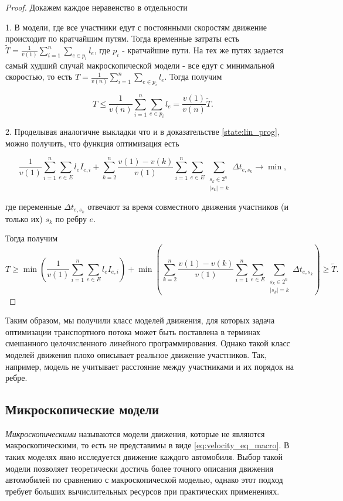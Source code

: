 \documentclass[12pt, a4paper]{article}
\DeclareMathOperator*{\minn}{min}
\begin{document}
\begin{proof}
	Докажем каждое неравенство в отдельности
	
	1. В модели, где все участники едут с постоянными скоростям движение происходит по кратчайшим путям. Тогда временные затраты есть $\widetilde{T} = \frac{1}{v(1)} \sum \limits _{i = 1} ^ n \sum\limits_{e \in p_i} l_e$, где $p_i$ - кратчайшие пути.
	На тех же путях задается самый худший случай макроскопической модели - все едут с минимальной скоростью, то есть $ T = \frac{1}{v(n)} \sum \limits _{i = 1} ^ n \sum\limits_{e \in p_i} l_e$. Тогда получим
	
	$$T \le  \frac{1}{v(n)} \sum \limits _{i = 1} ^ n \sum\limits_{e \in p_i} l_e = \frac {v(1)}{v(n)} \widetilde{T}.$$
	
	2. Проделывая аналогичне выкладки что и в доказательстве \ref{state:lin_prog}, можно получить, что функция оптимизация есть 
	
	$$ \frac{1}{v (1)} \sum\limits_{i = 1}^n \sum \limits _{e \in E} l_e I_{e, i} +  \sum\limits_{k = 2}^{n} \frac{v(1) - v(k)}{v (1)}  \sum\limits_{i = 1}^n \sum \limits _{e \in E} \sum\limits _{\substack{ s_k \in 2^n \\ |s_k| = k}}  \Delta t_{e, s_k} \rightarrow \minn ,$$
	
	где переменные $\Delta t_{e, s_k}$ отвечают за время совместного движения участников (и только их) $s_k$ по ребру $e$.
	
	Тогда получим
		$$T \ge 
		  \minn \left(  \frac{1}{v (1)} \sum\limits_{i = 1}^n \sum \limits _{e \in E} l_e I_{e, i} \right) 
		+ \minn \left(  \sum\limits_{k = 2}^{n} \frac{v(1) - v(k)}{v (1)}  \sum\limits_{i = 1}^n \sum \limits _{e \in E} \sum\limits _{\substack{ s_k \in 2^n \\ |s_k| = k}}  \Delta t_{e, s_k} \right) \ge \widetilde{T}.$$

\end{proof}

Таким образом, мы получили класс моделей движения, для которых задача оптимизации транспортного потока может быть поставлена в терминах смешанного целочисленного линейного программирования. Однако такой класс моделей движения плохо описывает реальное движение участников. Так, например, модель не учитывает расстояние между участниками и их порядок на ребре.

\subsection{Микроскопические модели}
\textit {Микроскопическими} называются модели движения, которые не являются макроскопическими, то есть не представимы в виде \eqref{eq:velocity_eq_macro}. В таких моделях явно исследуется движение каждого автомобиля.
Выбор такой модели позволяет теоретически достичь более точного описания движения автомобилей по сравнению с макроскопической моделью, однако этот подход требует больших вычислительных ресурсов при практических применениях.
\end{document}
